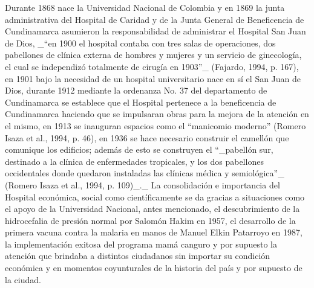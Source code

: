 Durante 1868 nace la Universidad Nacional de Colombia y en 1869 la junta administrativa del Hospital de Caridad y de la Junta General de Beneficencia de Cundinamarca asumieron la responsabilidad de administrar el Hospital San Juan de Dios, _“en 1900 el hospital contaba con tres salas de operaciones, dos pabellones de clínica externa de hombres y mujeres y un servicio de ginecología, el cual se independizó totalmente de cirugía en 1903”_ (Fajardo, 1994, p. 167), en 1901 bajo la necesidad de un hospital universitario nace en sí el San Juan de Dios, durante 1912 mediante la ordenanza No. 37 del departamento de Cundinamarca se establece que el Hospital pertenece a la beneficencia de Cundinamarca haciendo que se impulsaran obras para la mejora de la atención en el mismo, en 1913 se inauguran espacios como el “manicomio moderno” (Romero Isaza et al., 1994, p. 46), en 1936 se hace necesario construir el camellón que comunique los edificios; además de esto se construyen el “_pabellón sur, destinado a la clínica de enfermedades tropicales, y los dos pabellones occidentales donde quedaron instaladas las clínicas médica y semiológica”_ (Romero Isaza et al., 1994, p. 109)_._ La consolidación e importancia del Hospital económica, social como científicamente se da gracias a situaciones como el apoyo de la Universidad Nacional, antes mencionado, el descubrimiento de la hidrocefalia de presión normal por Salomón Hakim en 1957, el desarrollo de la primera vacuna contra la malaria en manos de Manuel Elkin Patarroyo en 1987, la implementación exitosa del programa mamá canguro y por supuesto la atención que brindaba a distintos ciudadanos sin importar su condición económica y en momentos coyunturales de la historia del país y por supuesto de la ciudad.

